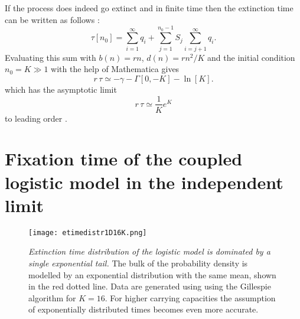 If the process does indeed go extinct and in finite time then the extinction time can be written as follows \cite{Nisbet1982}:
\begin{equation} \label{etime-approx0}
\tau[n_0] = \sum_{i=1}^{\infty}q_i + \sum_{j=1}^{n_0-1} S_j\sum_{i=j+1}^{\infty}q_i.
\end{equation}
Evaluating this sum with $b(n)=r n$, $d(n)=rn^2/K$ and the initial condition $n_0 = K \gg 1$ with the help of Mathematica gives
\begin{equation*}
r\,\tau \simeq -\gamma - \Gamma[0,-K] - \ln[K].
\end{equation*}
which has the asymptotic limit
\begin{equation} \label{1Dlog}
r\,\tau \simeq \frac{1}{K}e^K
\end{equation}
to leading order \cite{Lande1993}.
\fi


\section{Fixation time of the coupled logistic model in the independent limit}
\begin{figure}[ht]
	\texttt{[image: etimedistr1D16K.png]}
	\caption{\emph{Extinction time distribution of the logistic model is dominated by a single exponential tail.} 
		The bulk of the probability density is modelled by an exponential distribution with the same mean, shown in the red dotted line.  Data are generated using using the Gillespie algorithm for $K=16$. For higher carrying capacities the assumption of exponentially distributed times becomes even more accurate. } \label{etimedistr}
\end{figure}


